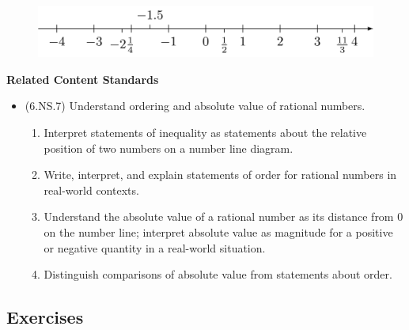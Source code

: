 \documentclass[
]{book}
\providecommand{\tightlist}{%
  \setlength{\itemsep}{0pt}\setlength{\parskip}{0pt}}
\newenvironment{standards}{}{}
\theoremstyle{definition}
\theoremstyle{definition}
\theoremstyle{definition}
\theoremstyle{definition}
\theoremstyle{remark}
\begin{document}
\begin{figure}

{\centering \includegraphics[width=0.6\linewidth]{tikz/number-line-rationals} 

}

\end{figure}

\begin{standards}

\begin{center}
\textbf{Related Content Standards}

\end{center}

\begin{itemize}
\tightlist
\item
  (6.NS.7) Understand ordering and absolute value of rational numbers.

  \begin{enumerate}
  \def\labelenumi{\alph{enumi}.}
  \tightlist
  \item
    Interpret statements of inequality as statements about the relative position of two numbers on a number line diagram.
  \item
    Write, interpret, and explain statements of order for rational numbers in real-world contexts.
  \item
    Understand the absolute value of a rational number as its distance from 0 on the number line; interpret absolute value as magnitude for a positive or negative quantity in a real-world situation.
  \item
    Distinguish comparisons of absolute value from statements about order.
  \end{enumerate}
\end{itemize}

\end{standards}

\hypertarget{exercises-14}{%
\subsection{Exercises}\label{exercises-14}}
\end{document}
